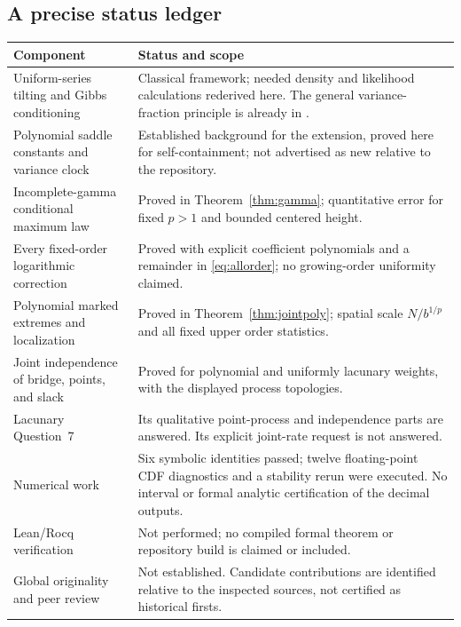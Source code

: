 \documentclass[11pt,a4paper]{article}
\numberwithin{equation}{section}
\theoremstyle{definition}
\theoremstyle{remark}
\begin{document}
\subsection{A precise status ledger}
\begin{longtable}{>{\raggedright\arraybackslash}p{.34\linewidth}
                  >{\raggedright\arraybackslash}p{.59\linewidth}}
\toprule
Component & Status and scope\\
\midrule
\endhead
Uniform-series tilting and Gibbs conditioning & Classical framework;
needed density and likelihood calculations rederived here.
The general variance-fraction principle is already in \cite{repounif}.\\[4pt]
Polynomial saddle constants and variance clock & Established background
for the extension, proved here for self-containment; not advertised as
new relative to the repository.\\[4pt]
Incomplete-gamma conditional maximum law & Proved in
Theorem~\ref{thm:gamma}; quantitative error for fixed $p>1$ and bounded
centered height.\\[4pt]
Every fixed-order logarithmic correction & Proved with explicit
coefficient polynomials and a remainder in \eqref{eq:allorder}; no
growing-order uniformity claimed.\\[4pt]
Polynomial marked extremes and localization & Proved in
Theorem~\ref{thm:jointpoly}; spatial scale $N/b^{1/p}$ and all fixed
upper order statistics.\\[4pt]
Joint independence of bridge, points, and slack & Proved for polynomial
and uniformly lacunary weights, with the displayed process topologies.\\[4pt]
Lacunary Question~7 & Its qualitative point-process and independence
parts are answered. Its explicit joint-rate request is not answered.\\[4pt]
Numerical work & Six symbolic identities passed; twelve floating-point
CDF diagnostics and a stability rerun were executed. No interval or
formal analytic certification of the decimal outputs.\\[4pt]
Lean/Rocq verification & Not performed; no compiled formal theorem or
repository build is claimed or included.\\[4pt]
Global originality and peer review & Not established. Candidate
contributions are identified relative to the inspected sources, not
certified as historical firsts.\\
\bottomrule
\end{longtable}
\end{document}
